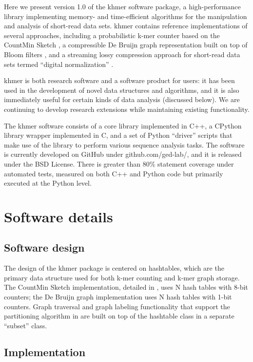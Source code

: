 \documentclass[10pt]{article}
\begin{document}
Here we present version 1.0 of the khmer software package, a
high-performance library implementing memory- and time-efficient
algorithms for the manipulation and analysis of short-read data sets.  khmer
contains reference implementations of several approaches, including a
probabilistic k-mer counter based on the CountMin Sketch \cite{Zhang2013}, a
compressible De Bruijn graph representation built on top of Bloom
filters \cite{Pell2012}, and a streaming lossy compression approach for
short-read data sets termed ``digital normalization'' \cite{Brown2012}.

khmer is both research software and a software product for users: it
has been used in the development of novel data structures and
algorithms, and it is also immediately useful for certain kinds of
data analysis (discussed below).  We are continuing to develop research
extensions while maintaining existing functionality.

The khmer software consists of a core library implemented in C++, a
CPython library wrapper implemented in C, and a set of Python
``driver'' scripts that make use of the library to perform various
sequence analysis tasks.  The software is currently developed on
GitHub under github.com/ged-lab/, and it is released under the BSD
License.  There is greater than 80\% statement coverage under
automated tests, measured on both C++ and Python code but primarily
executed at the Python level.

\section*{Software details}

\subsection*{Software design}

The design of the khmer package is centered on hashtables, which are
the primary data structure used for both k-mer counting and k-mer
graph storage.  The CountMin Sketch implementation, detailed in \cite{Zhang2013},
uses N hash tables with 8-bit counters; the De Bruijn graph implementation
uses N hash tables with 1-bit counters.  Graph traversal and
graph labeling functionality that support the partitioning algorithm
in \cite{Pell2012} are built on top of the hashtable class in a separate ``subset''
class.

\subsection*{Implementation}
\end{document}
